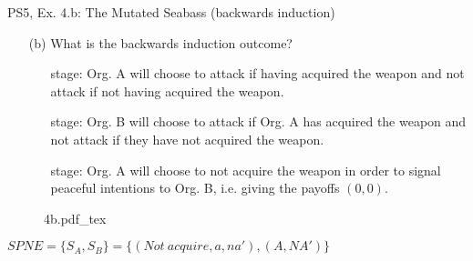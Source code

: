 \begin{frame}{PS5, Ex. 4.b: The Mutated Seabass (backwards induction)}
  \begin{itemize}
    \item[(b)] What is the backwards induction outcome?
    \begin{itemize}\normalsize
      \item[\nth{3} stage:] Org. A will choose to attack if having acquired the weapon and not attack if not having acquired the weapon.
      \item[\nth{2} stage:] Org. B will choose to attack if Org. A has acquired the weapon and not attack if they have not acquired the weapon.
      \item[\nth{1} stage:] Org. A will choose to not acquire the weapon in order to signal peaceful intentions to Org. B, i.e. giving the payoffs $(0,0)$.
    \end{itemize}
  \end{itemize}
  \vspace{-8pt}
  \begin{figure}[!h]
    \center
    \def\svgwidth{\columnwidth}
    {4b.pdf_tex}
  \end{figure}
  \vspace{-4pt}
  $SPNE=\{S_A,S_B\}=\{ (Not\ acquire, a, na'),(A, NA') \}$
  \vfill\null
\end{frame}

